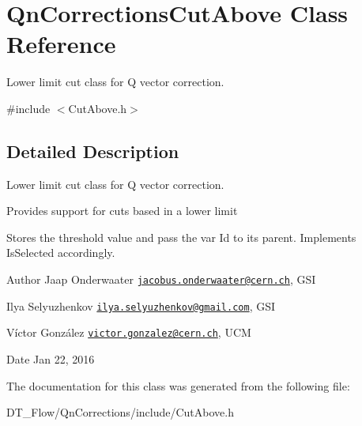 \hypertarget{classQnCorrectionsCutAbove}{}\section{Qn\+Corrections\+Cut\+Above Class Reference}
\label{classQnCorrectionsCutAbove}


Lower limit cut class for Q vector correction.  




{\ttfamily \#include $<$Cut\+Above.\+h$>$}



\subsection{Detailed Description}
Lower limit cut class for Q vector correction. 

Provides support for cuts based in a lower limit

Stores the threshold value and pass the var Id to its parent. Implements Is\+Selected accordingly.

\begin{DoxyAuthor}{Author}
Jaap Onderwaater \href{mailto:jacobus.onderwaater@cern.ch}{\tt jacobus.\+onderwaater@cern.\+ch}, G\+SI 

Ilya Selyuzhenkov \href{mailto:ilya.selyuzhenkov@gmail.com}{\tt ilya.\+selyuzhenkov@gmail.\+com}, G\+SI 

Víctor González \href{mailto:victor.gonzalez@cern.ch}{\tt victor.\+gonzalez@cern.\+ch}, U\+CM 
\end{DoxyAuthor}
\begin{DoxyDate}{Date}
Jan 22, 2016 
\end{DoxyDate}


The documentation for this class was generated from the following file\+:\begin{DoxyCompactItemize}
\item 
D\+T\+\_\+\+Flow/\+Qn\+Corrections/include/Cut\+Above.\+h\end{DoxyCompactItemize}
